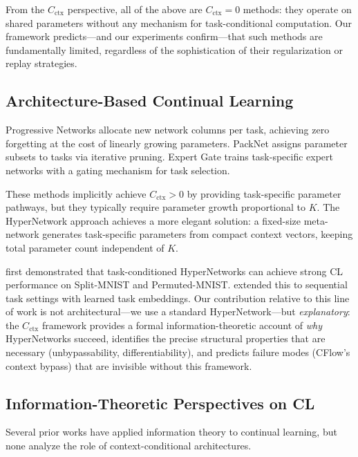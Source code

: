 \documentclass{article}
\begin{document}
From the $C_\mathrm{ctx}$ perspective, all of the above are $C_\mathrm{ctx} = 0$ methods: they operate on shared parameters without any mechanism for task-conditional computation. Our framework predicts---and our experiments confirm---that such methods are fundamentally limited, regardless of the sophistication of their regularization or replay strategies.

\subsection{Architecture-Based Continual Learning}

Progressive Networks \citep{rusu2016progressive} allocate new network columns per task, achieving zero forgetting at the cost of linearly growing parameters. PackNet \citep{mallya2018packnet} assigns parameter subsets to tasks via iterative pruning. Expert Gate \citep{aljundi2017expert} trains task-specific expert networks with a gating mechanism for task selection.

These methods implicitly achieve $C_\mathrm{ctx} > 0$ by providing task-specific parameter pathways, but they typically require parameter growth proportional to $K$. The HyperNetwork approach \citep{von2019continual} achieves a more elegant solution: a fixed-size meta-network generates task-specific parameters from compact context vectors, keeping total parameter count independent of $K$.

\citet{von2019continual} first demonstrated that task-conditioned HyperNetworks can achieve strong CL performance on Split-MNIST and Permuted-MNIST. \citet{ehret2021continual} extended this to sequential task settings with learned task embeddings. Our contribution relative to this line of work is not architectural---we use a standard HyperNetwork---but \emph{explanatory}: the $C_\mathrm{ctx}$ framework provides a formal information-theoretic account of \emph{why} HyperNetworks succeed, identifies the precise structural properties that are necessary (unbypassability, differentiability), and predicts failure modes (CFlow's context bypass) that are invisible without this framework.

\subsection{Information-Theoretic Perspectives on CL}

Several prior works have applied information theory to continual learning, but none analyze the role of context-conditional architectures.
\end{document}
